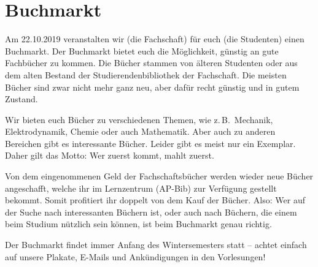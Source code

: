 \vspace{-6ex}
\section{Buchmarkt}
\vspace{-3ex}
\begin{multicols*}{2}
\begin{figure}
\end{figure}
Am 22.10.2019 veranstalten wir (die Fachschaft) für euch (die Studenten) einen Buchmarkt.
Der Buchmarkt bietet euch die Möglichkeit, günstig an gute Fachbücher zu kommen.
Die Bücher stammen von älteren Studenten oder aus dem alten Bestand der Studierendenbibliothek der Fachschaft.
Die meisten Bücher sind zwar nicht mehr ganz neu, aber dafür recht günstig und in gutem Zustand.

Wir bieten euch Bücher zu verschiedenen Themen, wie z.\,B.\ Mechanik, Elektrodynamik, Chemie oder auch Mathematik.
Aber auch zu anderen Bereichen gibt es interessante Bücher.
Leider gibt es meist nur ein Exemplar.
Daher gilt das Motto: Wer zuerst kommt, mahlt zuerst.

Von dem eingenommenen Geld der Fachschaftsbücher werden wieder neue Bücher angeschafft, welche ihr im Lernzentrum (AP-Bib) zur Verfügung gestellt bekommt.
Somit profitiert ihr doppelt von dem Kauf der Bücher.
Also: Wer auf der Suche nach interessanten Büchern ist, oder auch nach Büchern, die einem beim Studium nützlich sein können, ist beim Buchmarkt genau richtig.

Der Buchmarkt findet immer Anfang des Wintersemesters statt -- achtet einfach auf unsere Plakate, E-Mails und Ankündigungen in den Vorlesungen!

\end{multicols*}

